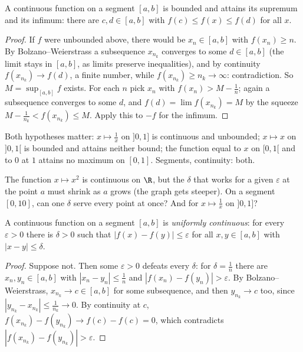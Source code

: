 \begin{theorem}\label{thm:evt}
A continuous function on a segment $[a,b]$ is bounded and attains its supremum and its infimum: there are $c,d\in[a,b]$ with $f(c)\le f(x)\le f(d)$ for all $x$.
\end{theorem}
\begin{proof}
If $f$ were unbounded above, there would be $x_n\in[a,b]$ with $f(x_n)\ge n$. By Bolzano--Weierstrass a subsequence $x_{n_k}$ converges to some $d\in[a,b]$
(the limit stays in $[a,b]$, as limits preserve inequalities), and by continuity $f(x_{n_k})\to f(d)$, a finite number, while $f(x_{n_k})\ge n_k\to\infty$: contradiction.
So $M=\sup_{[a,b]}f$ exists. For each $n$ pick $x_n$ with $f(x_n)>M-\frac1n$; again a subsequence converges to some $d$, and $f(d)=\lim f(x_{n_k})=M$ by the squeeze
$M-\frac1{n_k}<f(x_{n_k})\le M$. Apply this to $-f$ for the infimum.
\end{proof}

Both hypotheses matter: $x\mapsto\frac1x$ on $]0,1]$ is continuous and unbounded; $x\mapsto x$ on $]0,1[$ is bounded and attains neither bound; the
function equal to $x$ on $[0,1[$ and to $0$ at $1$ attains no maximum on $[0,1]$. Segments, continuity: both.

\begin{think}
The function $x\mapsto x^2$ is continuous on $\R$, but the $\delta$ that works for a given $\varepsilon$ at the point $a$ must shrink as $a$ grows (the graph gets steeper). On a segment $[0,10]$, can one $\delta$ serve every point at once? And for $x\mapsto\frac1x$ on $]0,1]$?
\end{think}

\begin{theorem}\label{thm:heine}
A continuous function on a segment $[a,b]$ is \emph{uniformly continuous}: for every $\varepsilon>0$ there is $\delta>0$ such that $|f(x)-f(y)|\le\varepsilon$
for all $x,y\in[a,b]$ with $|x-y|\le\delta$.
\end{theorem}
\begin{proof}
Suppose not. Then some $\varepsilon>0$ defeats every $\delta$: for $\delta=\frac1n$ there are $x_n,y_n\in[a,b]$ with $|x_n-y_n|\le\frac1n$ and $|f(x_n)-f(y_n)|>\varepsilon$.
By Bolzano--Weierstrass, $x_{n_k}\to c\in[a,b]$ for some subsequence, and then $y_{n_k}\to c$ too, since $|y_{n_k}-x_{n_k}|\le\frac1{n_k}\to0$. By continuity at $c$,
$f(x_{n_k})-f(y_{n_k})\to f(c)-f(c)=0$, which contradicts $|f(x_{n_k})-f(y_{n_k})|>\varepsilon$.
\end{proof}

